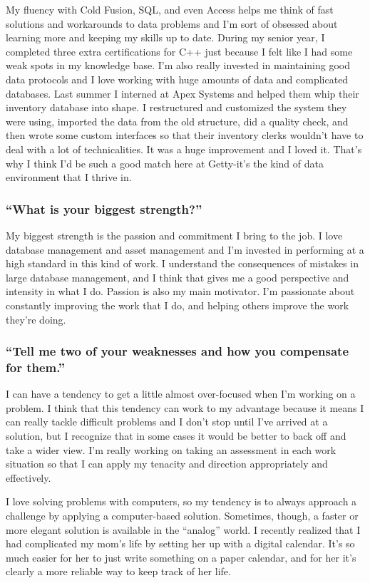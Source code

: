 My fluency with Cold Fusion, SQL, and even Access helps me think of fast solutions and workarounds to data problems and I'm sort of obsessed about learning more and keeping my skills up to date. During my senior year, I completed three extra certifications for C++ just because I felt like I had some weak spots in my knowledge base. I'm also really invested in maintaining good data protocols and I love working with huge amounts of data and complicated databases. Last summer I interned at Apex Systems and helped them whip their inventory database into shape. I restructured and customized the system they were using, imported the data from the old structure, did a quality check, and then wrote some custom interfaces so that their inventory clerks wouldn't have to deal with a lot of technicalities. It was a huge improvement and I loved it. That's why I think I'd be such a good match here at Getty-it's the kind of data environment that I thrive in.

\subsubsection*{``What is your biggest strength?''}
\break My biggest strength is the passion and commitment I bring to the job. I love database management and asset management and I'm invested in performing at a high standard in this kind of work. I understand the consequences of mistakes in large database management, and I think that gives me a good perspective and intensity in what I do. Passion is also my main motivator. I'm passionate about constantly improving the work that I do, and helping others improve the work they're doing.

\subsubsection*{``Tell me two of your weaknesses and how you compensate for them.''}
\break I can have a tendency to get a little almost over-focused when I'm working on a problem. I think that this tendency can work to my advantage because it means I can really tackle difficult problems and I don't stop until I've arrived at a solution, but I recognize that in some cases it would be better to back off and take a wider view. I'm really working on taking an assessment in each work situation so that I can apply my tenacity and direction appropriately and effectively.

I love solving problems with computers, so my tendency is to always approach a challenge by applying a computer-based solution. Sometimes, though, a faster or more elegant solution is available in the ``analog'' world. I recently realized that I had complicated my mom's life by setting her up with a digital calendar. It's so much easier for her to just write something on a paper calendar, and for her it's clearly a more reliable way to keep track of her life.

